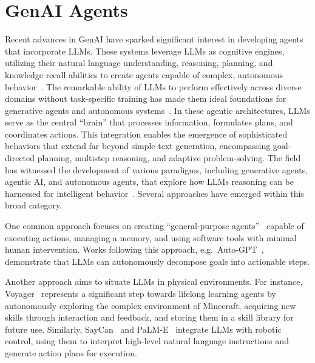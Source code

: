 \documentclass[12pt,a4paper,openright,twoside]{book}
\begin{document}
\section{GenAI Agents}

Recent advances in \ac{GenAI} have sparked significant interest in developing agents that incorporate \acp{LLM}.
%
These systems leverage \acp{LLM} as cognitive engines, utilizing their natural language understanding, reasoning, planning, and knowledge recall abilities to create agents capable of complex, autonomous behavior~\cite{ParkOCMLB23, SumersYN024, WangMFZYZCTCLZWW24}. 
%
The remarkable ability of \acp{LLM} to perform effectively across diverse domains without task-specific training has made them ideal foundations for generative agents and autonomous systems~\cite{BubeckCEHLKLPZ23}.
%
In these agentic architectures, \acp{LLM} serve as the central ``brain'' that processes information, formulates plans, and coordinates actions. 
%
This integration enables the emergence of sophisticated behaviors that extend far beyond simple text generation, encompassing goal-directed planning, multistep reasoning, and adaptive problem-solving.
%
The field has witnessed the development of various paradigms, including generative agents, agentic AI, and autonomous agents, that explore how \acp{LLM} reasoning can be harnessed for intelligent behavior~\cite{Murugesan25a}.
%
Several approaches have emerged within this broad category.

One common approach focuses on creating ``general-purpose agents''~\cite{Murugesan25a} capable of executing actions, managing a memory, and using software tools with minimal human intervention.
%
Works following this approach, e.g.\ Auto-GPT~\cite{YangYH23}, demonstrate that \acp{LLM} can autonomously decompose goals into actionable steps.

Another approach aims to situate \acp{LLM} in physical environments.
%
For instance, Voyager~\cite{WangX0MXZFA24} represents a significant step towards lifelong learning agents by autonomously exploring the complex environment of Minecraft, acquiring new skills through interaction and feedback, and storing them in a skill library for future use.
%
Similarly, SayCan~\cite{HazraMR24} and PaLM-E~\cite{DriessXSLCIWTVY23} integrate \acp{LLM} with robotic control, using them to interpret high-level natural language instructions and generate action plans for execution.
\end{document}
